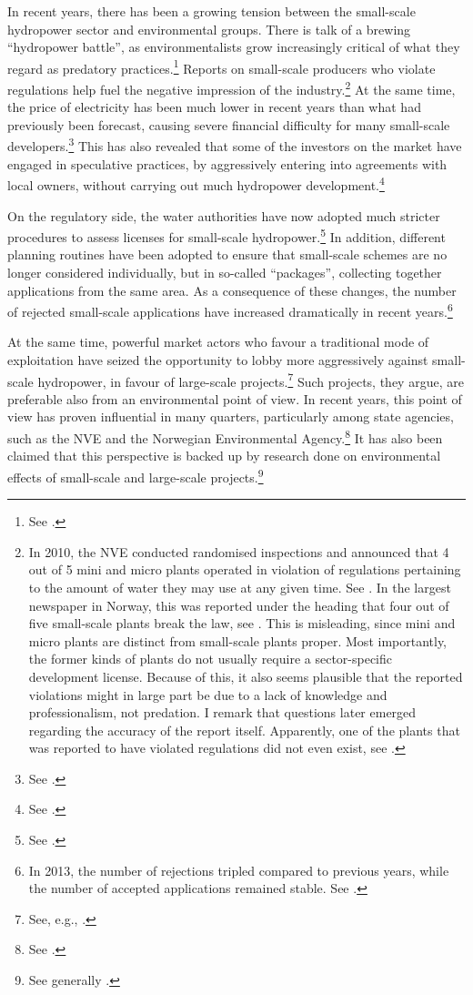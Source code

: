 In recent years, there has been a growing tension between the small-scale hydropower sector and environmental groups. There is talk of a brewing ``hydropower battle'', as environmentalists grow increasingly critical of what they regard as predatory practices.\footnote{See \cite{haltbrekken12}.}
Reports on small-scale producers who violate regulations help fuel the negative impression of the industry.\footnote{In 2010, the NVE conducted randomised inspections and announced that 4 out of 5 mini and micro plants operated in violation of regulations pertaining to the amount of water they may use at any given time. See \cite{ulovlig10}. In the largest newspaper in Norway, this was reported under the heading that four out of five small-scale plants break the law, see \cite{ulovlig10b}. This is misleading, since mini and micro plants are distinct from small-scale plants proper. Most importantly, the former kinds of plants do not usually require a sector-specific development license. Because of this, it also seems plausible that the reported violations might in large part be due to a lack of knowledge and professionalism, not predation. I remark that questions later emerged regarding the accuracy of the report itself. Apparently, one of the plants that was reported to have violated regulations did not even exist, see \cite{tvilsom10}.} At the same time, the price of electricity has been much lower in recent years than what had previously been forecast, causing severe financial difficulty for many small-scale developers.\footnote{See \cite{sunde14}.} This has also revealed that some of the investors on the market have engaged in speculative practices, by aggressively entering into agreements with local owners, without carrying out much hydropower development.\footnote{See \cite{endresen14}.}

On the regulatory side, the water authorities have now adopted much stricter procedures to assess licenses for small-scale hydropower.\footnote{See \cite{lie12}.} In addition, different planning routines have been adopted to ensure that small-scale schemes are no longer considered individually, but in so-called ``packages'', collecting together applications from the same area. As a consequence of these changes, the number of rejected small-scale applications have increased dramatically in recent years.\footnote{In 2013, the number of rejections tripled compared to previous years, while the number of accepted applications remained stable. See \cite{sunde14b}.}

At the same time, powerful market actors who favour a traditional mode of exploitation have seized the opportunity to lobby more aggressively against small-scale hydropower, in favour of large-scale projects.\footnote{See, e.g., \cite{alexandersen14}.} Such projects, they argue, are preferable also from an environmental point of view. In recent years, this point of view has proven influential in many quarters, particularly among state agencies, such as the NVE and the Norwegian Environmental Agency.\footnote{See \cite{nilsen11}.} It has also been claimed that this perspective is backed up by research done on environmental effects of small-scale and large-scale projects.\footnote{See generally \cite{bakken12,bakken14}.} 

